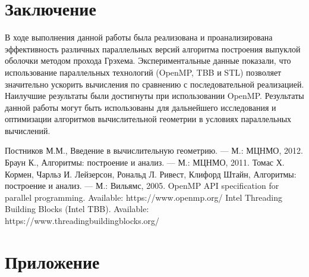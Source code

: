 \documentclass{report}
\begin{document}
\newpage

\section*{Заключение}
\par В ходе выполнения данной работы была реализована и проанализирована эффективность различных параллельных версий алгоритма построения выпуклой оболочки методом прохода Грэхема. Экспериментальные данные показали, что использование параллельных технологий (OpenMP, TBB и STL) позволяет значительно ускорить вычисления по сравнению с последовательной реализацией. Наилучшие результаты были достигнуты при использовании OpenMP. Результаты данной работы могут быть использованы для дальнейшего исследования и оптимизации алгоритмов вычислительной геометрии в условиях параллельных вычислений.

\newpage

\begin{thebibliography}{9}
Постников М.М., Введение в вычислительную геометрию. — М.: МЦНМО, 2012.
Браун К., Алгоритмы: построение и анализ. — М.: МЦНМО, 2011.
Томас Х. Кормен, Чарльз И. Лейзерсон, Рональд Л. Ривест, Клифорд Штайн, Алгоритмы: построение и анализ. — М.: Вильямс, 2005.
OpenMP API specification for parallel programming. Available: https://www.openmp.org/
Intel Threading Building Blocks (Intel TBB). Available: https://www.threadingbuildingblocks.org/
\end{thebibliography}


\newpage

\section*{Приложение}
\end{document}
